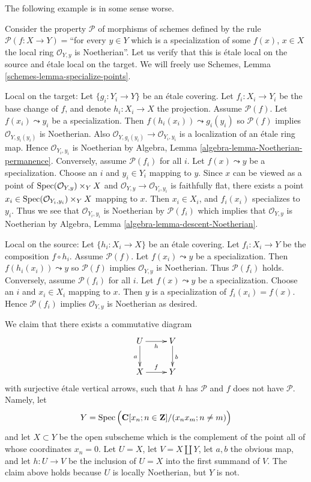 \noindent
The following example is in some sense worse.

\begin{example}
\label{example-silly-two}
Consider the property $\mathcal{P}$ of morphisms of schemes defined
by the rule $\mathcal{P}(f : X \to Y) = $``for every $y \in Y$ which is
a specialization of some $f(x)$, $x \in X$ the local ring
$\mathcal{O}_{Y, y}$ is Noetherian''. Let us verify that this is
\'etale local on the source and \'etale local on the target. We will freely use
Schemes, Lemma \ref{schemes-lemma-specialize-points}.

\medskip\noindent
Local on the target:
Let $\{g_i : Y_i \to Y\}$ be an \'etale covering. Let $f_i : X_i \to Y_i$
be the base change of $f$, and denote $h_i : X_i \to X$ the projection.
Assume $\mathcal{P}(f)$. Let $f(x_i) \leadsto y_i$
be a specialization. Then $f(h_i(x_i)) \leadsto g_i(y_i)$ so
$\mathcal{P}(f)$ implies $\mathcal{O}_{Y, g_i(y_i)}$ is Noetherian.
Also $\mathcal{O}_{Y, g_i(y_i)} \to \mathcal{O}_{Y_i, y_i}$ is a
localization of an \'etale ring map.
Hence $\mathcal{O}_{Y_i, y_i}$ is Noetherian by
Algebra, Lemma \ref{algebra-lemma-Noetherian-permanence}.
Conversely, assume $\mathcal{P}(f_i)$ for all $i$. Let $f(x) \leadsto y$
be a specialization. Choose an $i$ and $y_i \in Y_i$ mapping to $y$.
Since $x$ can be viewed as a point of
$\mathop{\mathrm{Spec}}(\mathcal{O}_{Y, y}) \times_Y X$ and
$\mathcal{O}_{Y, y} \to \mathcal{O}_{Y_i, y_i}$ is faithfully flat,
there exists a point
$x_i \in \mathop{\mathrm{Spec}}(\mathcal{O}_{Y_i, y_i}) \times_Y X$
mapping to $x$. Then $x_i \in X_i$, and $f_i(x_i)$ specializes to $y_i$.
Thus we see that $\mathcal{O}_{Y_i, y_i}$ is Noetherian by
$\mathcal{P}(f_i)$ which implies that $\mathcal{O}_{Y, y}$ is
Noetherian by
Algebra, Lemma \ref{algebra-lemma-descent-Noetherian}.

\medskip\noindent
Local on the source:
Let $\{h_i : X_i \to X\}$ be an \'etale covering. Let $f_i : X_i \to Y$
be the composition $f \circ h_i$. Assume $\mathcal{P}(f)$. Let
$f(x_i) \leadsto y$ be a specialization. Then $f(h_i(x_i)) \leadsto y$ so
$\mathcal{P}(f)$ implies $\mathcal{O}_{Y, y}$ is Noetherian. Thus
$\mathcal{P}(f_i)$ holds.
Conversely, assume $\mathcal{P}(f_i)$ for all $i$. Let $f(x) \leadsto y$
be a specialization. Choose an $i$ and $x_i \in X_i$ mapping to $x$.
Then $y$ is a specialization of $f_i(x_i) = f(x)$. Hence
$\mathcal{P}(f_i)$ implies $\mathcal{O}_{Y, y}$ is Noetherian
as desired.

\medskip\noindent
We claim that there exists a commutative diagram
$$
\xymatrix{
U \ar[d]_a \ar[r]_h & V \ar[d]^b \\
X \ar[r]^f & Y
}
$$
with surjective \'etale vertical arrows, such that $h$ has $\mathcal{P}$
and $f$ does not have $\mathcal{P}$. Namely, let
$$
Y =
\mathop{\mathrm{Spec}}\Big(
\mathbf{C}[x_n; n \in \mathbf{Z}]/(x_n x_m; n \not = m)
\Big)
$$
and let $X \subset Y$ be the open subscheme which is the complement of
the point all of whose coordinates $x_n = 0$. Let $U = X$, let
$V = X \amalg Y$, let $a, b$ the obvious map, and let $h : U \to V$
be the inclusion of $U = X$ into the first summand of $V$. The claim above
holds because $U$ is locally Noetherian, but $Y$ is not.
\end{example}

